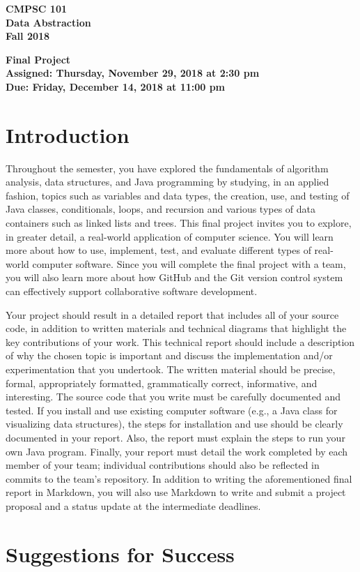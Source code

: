 \documentclass[11pt]{article}
\newcommand{\assignmentduedate}{December 14}
\newcommand{\assignmentassignedate}{November 29}
\newcommand{\labyear}{2018}
\newcommand{\labday}{Thursday}
\newcommand{\labdueday}{Friday}
\newcommand{\labtime}{2:30 pm}
\newcommand{\labduetime}{11:00 pm}
\newcommand{\assigneddate}{Assigned: \labday, \assignmentassignedate, \labyear{} at \labtime{}}
\newcommand{\duedate}{Due: \labdueday, \assignmentduedate, \labyear{} at \labduetime{}}
\newcommand{\labtitle}[1]
{
  \begin{center}
    \begin{center}
      \bf
      CMPSC 101\\Data Abstraction\\
      Fall 2018\\
      \medskip
    \end{center}
    \bf
    #1
  \end{center}
}
\begin{document}
\thispagestyle{empty}

\labtitle{Final Project \\ \assigneddate{} \\ \duedate{}}

\section*{Introduction}

Throughout the semester, you have explored the fundamentals of algorithm
analysis, data structures, and Java programming by studying, in an applied
fashion, topics such as variables and data types, the creation, use, and testing
of Java classes, conditionals, loops, and recursion and various types of data
containers such as linked lists and trees. This final project invites you to
explore, in greater detail, a real-world application of computer science. You
will learn more about how to use, implement, test, and evaluate different types
of real-world computer software. Since you will complete the final project with
a team, you will also learn more about how GitHub and the Git version control
system can effectively support collaborative software development.

Your project should result in a detailed report that includes all of your source
code, in addition to written materials and technical diagrams that highlight the
key contributions of your work. This technical report should include a
description of why the chosen topic is important and discuss the implementation
and/or experimentation that you undertook. The written material should be
precise, formal, appropriately formatted, grammatically correct, informative,
and interesting. The source code that you write must be carefully documented and
tested. If you install and use existing computer software (e.g., a Java class
for visualizing data structures), the steps for installation and use should be
clearly documented in your report. Also, the report must explain the steps to
run your own Java program. Finally, your report must detail the work completed
by each member of your team; individual contributions should also be reflected
in commits to the team's repository. In addition to writing the aforementioned
final report in Markdown, you will also use Markdown to write and submit a
project proposal and a status update at the intermediate deadlines.

\section*{Suggestions for Success}
\end{document}
